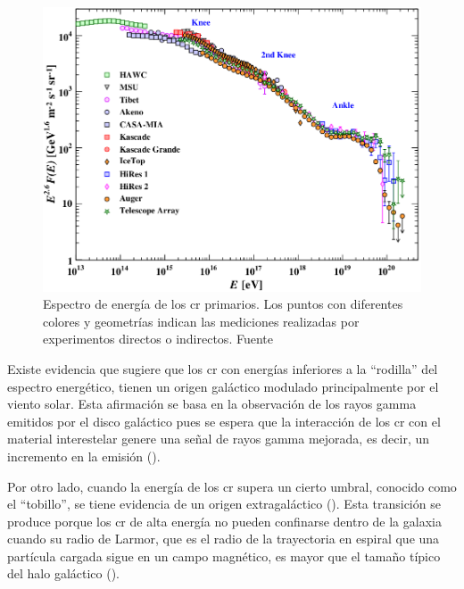 \begin{figure}
    \centering
    \includegraphics[width=0.8\linewidth]{Figs/CR_spectrum.png}
    \caption{Espectro de energía de los \gls{cr} primarios. Los puntos con diferentes colores y geometrías indican las mediciones realizadas por experimentos directos o indirectos. Fuente \cite{PDG}}
    \label{fig:spectrum}
\end{figure}

Existe evidencia que sugiere que los \gls{cr} con energías inferiores a la “rodilla” del espectro energético, tienen un origen galáctico modulado principalmente por el viento solar. Esta afirmación se basa en la observación de los rayos gamma emitidos por el disco galáctico pues se espera que la interacción de los \gls{cr} con el material interestelar genere una señal de rayos gamma mejorada, es decir, un incremento en la emisión (\cite{Cristofari_2023}).

Por otro lado, cuando la energía de los \gls{cr} supera un cierto umbral, conocido como el “tobillo”, se tiene evidencia de un origen extragaláctico (\cite{augerextra}). Esta transición se produce porque los \gls{cr} de alta energía no pueden confinarse dentro de la galaxia cuando su radio de Larmor, que es el radio de la trayectoria en espiral que una partícula cargada sigue en un campo magnético, es mayor que el tamaño típico del halo galáctico (\cite{spurio_2015}). 

